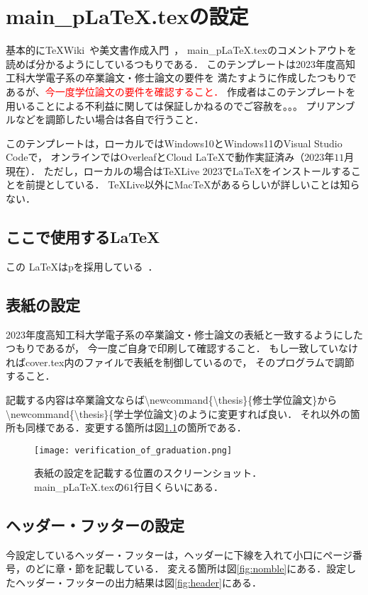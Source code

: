 \chapter{main\_pLaTeX.texの設定}
基本的に\TeX Wiki~\cite{platex}や美文書作成入門~\cite{美文書作成入門}，
main\_pLaTeX.texのコメントアウトを読めば分かるようにしているつもりである．
このテンプレートは2023年度高知工科大学電子系の卒業論文・修士論文の要件を
満たすように作成したつもりであるが、\textcolor{red}{今一度学位論文の要件を確認すること．}
作成者はこのテンプレートを用いることによる不利益に関しては保証しかねるのでご容赦を。。。
プリアンブルなどを調節したい場合は各自で行うこと．

このテンプレートは，ローカルではWindows10とWindows11のVisual Studio Codeで，
オンラインではOverleafとCloud LaTeXで動作実証済み（$2023$年$11$月現在）．
ただし，ローカルの場合は\TeX Live 2023で\LaTeX をインストールすることを前提としている．
\TeX Live以外にMac\TeX があるらしいが詳しいことは知らない．

\section{ここで使用する\LaTeX}
この \LaTeX はp\LaTeXe を採用している~\cite{美文書作成入門}．

\section{表紙の設定}
2023年度高知工科大学電子系の卒業論文・修士論文の表紙と一致するようにしたつもりであるが，
今一度ご自身で印刷して確認すること．
もし一致していなければcover.tex内のファイルで表紙を制御しているので，
そのプログラムで調節すること．

記載する内容は卒業論文ならば\textbackslash newcommand\{\textbackslash thesis\}\{修士学位論文\}から
\textbackslash newcommand\{\textbackslash thesis\}\{学士学位論文\}のように変更すれば良い．
それ以外の箇所も同様である．変更する箇所は図\ref{fig:cover}の箇所である．

\begin{figure}[h]
  \centering
  \texttt{[image: verification\_of\_graduation.png]}
  \caption{表紙の設定を記載する位置のスクリーンショット．main\_pLaTeX.texの$61$行目くらいにある．}
  \label{fig:cover}
\end{figure}

\section{ヘッダー・フッターの設定}
今設定しているヘッダー・フッターは，ヘッダーに下線を入れて小口にページ番号，のどに章・節を記載している．
変える箇所は図\ref{fig:nomble}にある．設定したヘッダー・フッターの出力結果は図\ref{fig:header}にある．

